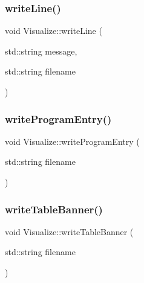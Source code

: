 \mbox{\label{class_visualize_a9ccde29aab876a829335775898373e96_a9ccde29aab876a829335775898373e96}} 
\subsubsection{\texorpdfstring{write\+Line()}{writeLine()}}
{\footnotesize\ttfamily void Visualize\+::write\+Line (\begin{DoxyParamCaption}\item[{std\+::string}]{message,  }\item[{std\+::string}]{filename }\end{DoxyParamCaption})}

\mbox{\label{class_visualize_a6e27b451c2662681cb3119e9ff1c22da_a6e27b451c2662681cb3119e9ff1c22da}} 
\subsubsection{\texorpdfstring{write\+Program\+Entry()}{writeProgramEntry()}}
{\footnotesize\ttfamily void Visualize\+::write\+Program\+Entry (\begin{DoxyParamCaption}\item[{std\+::string}]{filename }\end{DoxyParamCaption})}

\mbox{\label{class_visualize_a14c9e9721eeaca0afde25da0138b43b8_a14c9e9721eeaca0afde25da0138b43b8}} 
\subsubsection{\texorpdfstring{write\+Table\+Banner()}{writeTableBanner()}}
{\footnotesize\ttfamily void Visualize\+::write\+Table\+Banner (\begin{DoxyParamCaption}\item[{std\+::string}]{filename }\end{DoxyParamCaption})}

